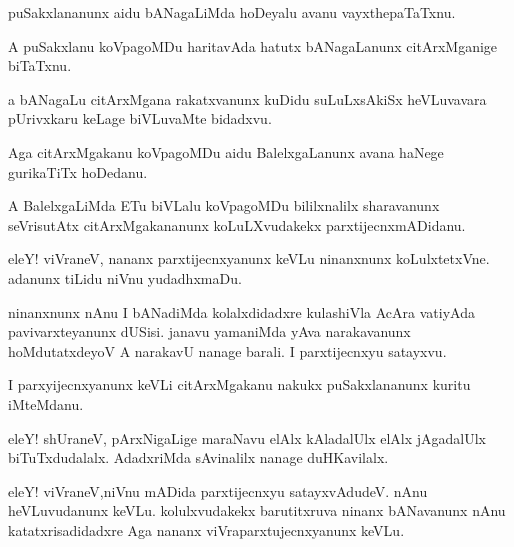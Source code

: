 \documentclass{article}
\begin{document}
\begin{mn}%
puSakxlananunx aidu bANagaLiMda hoDeyalu avanu vayxthepaTaTxnu.
\end{mn}

\begin{mn}%
A puSakxlanu koVpagoMDu haritavAda hatutx bANagaLanunx citArxMganige biTaTxnu.
\end{mn}

\begin{mn}%
a bANagaLu citArxMgana rakatxvanunx kuDidu suLuLxsAkiSx heVLuvavara pUrivxkaru keLage 
biVLuvaMte bidadxvu.
\end{mn}

\begin{mn}%
Aga citArxMgakanu koVpagoMDu aidu BalelxgaLanunx avana haNege gurikaTiTx hoDedanu.
\end{mn}

\begin{mn}%
A BalelxgaLiMda ETu biVLalu koVpagoMDu bililxnalilx sharavanunx seVrisutAtx 
citArxMgakananunx koLuLXvudakekx parxtijecnxmADidanu.
\end{mn}

\begin{mn}%
eleY! viVraneV, nananx parxtijecnxyanunx keVLu ninanxnunx koLulxtetxVne. adanunx tiLidu 
niVnu yudadhxmaDu.
\end{mn}

\begin{mn}%
ninanxnunx nAnu I bANadiMda kolalxdidadxre kulashiVla AcAra vatiyAda pavivarxteyanunx 
dUSisi. janavu yamaniMda yAva narakavanunx hoMdutatxdeyoV A narakavU nanage barali. I 
parxtijecnxyu satayxvu.
\end{mn}

\begin{mn}%
I parxyijecnxyanunx keVLi citArxMgakanu nakukx puSakxlananunx kuritu iMteMdanu. 
\end{mn}

\begin{mn}%
eleY! shUraneV, pArxNigaLige maraNavu elAlx kAladalUlx elAlx jAgadalUlx biTuTxdudalalx. 
AdadxriMda sAvinalilx nanage duHKavilalx.
\end{mn}

\begin{mn}%
eleY! viVraneV,niVnu mADida parxtijecnxyu satayxvAdudeV. nAnu heVLuvudanunx keVLu. 
kolulxvudakekx barutitxruva ninanx bANavanunx nAnu katatxrisadidadxre Aga nananx 
viVraparxtujecnxyanunx keVLu.
\end{mn}
\end{document}
